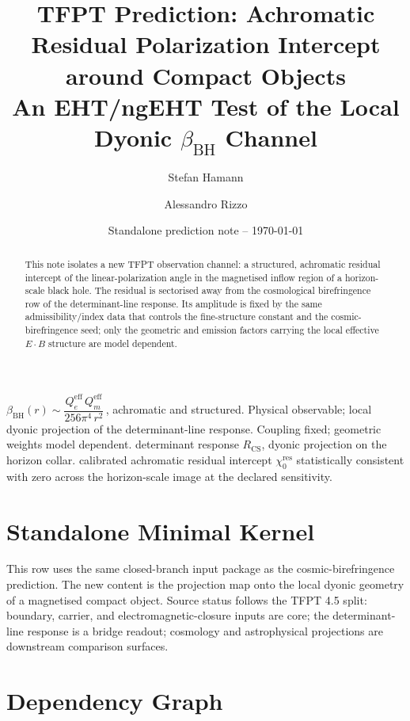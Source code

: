 \documentclass[11pt,a4paper]{article}
\title{\color{tfptblue}\textbf{TFPT Prediction: Achromatic Residual Polarization Intercept around Compact Objects}\\[0.35em]
{\Large An EHT/ngEHT Test of the Local Dyonic $\beta_{\mathrm{BH}}$ Channel}}
\author{Stefan Hamann \and Alessandro Rizzo}
\date{{\normalsize\color{tfptgray}\sffamily Standalone prediction note -- \today}}
\begin{document}
\maketitle

\begin{abstract}
This note isolates a new TFPT observation channel: a structured, achromatic residual intercept of
the linear-polarization angle in the magnetised inflow region of a horizon-scale black hole.
The residual is sectorised away from the cosmological birefringence row of the determinant-line
response. Its amplitude is fixed by the same admissibility/index data that controls the
fine-structure constant and the cosmic-birefringence seed; only the geometric and emission
factors carrying the local effective $E\!\cdot\!B$ structure are model dependent.
\end{abstract}

\PredictionStatus%
{$\beta_{\mathrm{BH}}(r)\sim \dfrac{Q_e^{\mathrm{eff}}\,Q_m^{\mathrm{eff}}}{256\pi^4\,r^2}$\,, achromatic and structured.}%
{Physical observable; local dyonic projection of the determinant-line response. Coupling fixed; geometric weights model dependent.}%
{determinant response $R_{\mathrm{CS}}$, dyonic projection on the horizon collar.}%
{calibrated achromatic residual intercept $\chi_0^{\mathrm{res}}$ statistically consistent with zero across the horizon-scale image at the declared sensitivity.}


\section{Standalone Minimal Kernel}
\MinimalKernelBox

This row uses the same closed-branch input package as the cosmic-birefringence prediction. The new
content is the projection map onto the local dyonic geometry of a magnetised compact object.
Source status follows the TFPT 4.5 split: boundary, carrier, and electromagnetic-closure inputs
are core; the determinant-line response is a bridge readout; cosmology and astrophysical
projections are downstream comparison surfaces.


\section{Dependency Graph}
\end{document}
